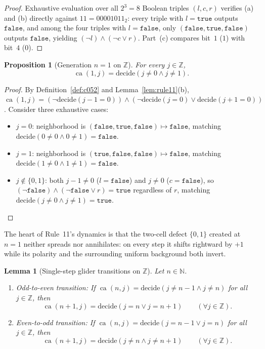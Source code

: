 \documentclass[11pt]{article}
\newtheorem{proposition}[theorem]{Proposition}
\newtheorem{lemma}[theorem]{Lemma}
\theoremstyle{definition}
\newcommand{\N}{\mathbb{N}}
\newcommand{\Z}{\mathbb{Z}}
\newcommand{\ca}{\operatorname{ca}}
\begin{document}
\begin{proof}
Exhaustive evaluation over all $2^3 = 8$ Boolean triples $(l, c, r)$ verifies (a) and (b) directly against $11 = 00001011_2$: every triple with $l = \mathtt{true}$ outputs $\mathtt{false}$, and among the four triples with $l = \mathtt{false}$, only $(\mathtt{false}, \mathtt{true}, \mathtt{false})$ outputs $\mathtt{false}$, yielding $(\neg l) \land (\neg c \lor r)$. Part~(c) compares bit~$1$ ($1$) with bit~$4$ ($0$).
\end{proof}

\begin{proposition}[Generation $n = 1$ on $\Z$]
\label{prop:ca-one}
For every $j \in \Z$,
\[
\ca(1, j) = \mathrm{decide}(j \ne 0 \land j \ne 1).
\]
\end{proposition}

\begin{proof}
By Definition~\ref{def:c052} and Lemma~\ref{lem:rule11}(b), $\ca(1, j) = (\neg \mathrm{decide}(j - 1 = 0)) \land (\neg \mathrm{decide}(j = 0) \lor \mathrm{decide}(j + 1 = 0))$. Consider three exhaustive cases:
\begin{itemize}
\item $j = 0$: neighborhood is $(\mathtt{false}, \mathtt{true}, \mathtt{false}) \mapsto \mathtt{false}$, matching $\mathrm{decide}(0 \ne 0 \land 0 \ne 1) = \mathtt{false}$.
\item $j = 1$: neighborhood is $(\mathtt{true}, \mathtt{false}, \mathtt{false}) \mapsto \mathtt{false}$, matching $\mathrm{decide}(1 \ne 0 \land 1 \ne 1) = \mathtt{false}$.
\item $j \notin \{0, 1\}$: both $j - 1 \ne 0$ ($l = \mathtt{false}$) and $j \ne 0$ ($c = \mathtt{false}$), so $(\neg \mathtt{false}) \land (\neg \mathtt{false} \lor r) = \mathtt{true}$ regardless of $r$, matching $\mathrm{decide}(j \ne 0 \land j \ne 1) = \mathtt{true}$. \qedhere
\end{itemize}
\end{proof}

The heart of Rule~11's dynamics is that the two-cell defect $\{0, 1\}$ created at $n = 1$ neither spreads nor annihilates: on every step it shifts rightward by $+1$ while its polarity and the surrounding uniform background both invert.

\begin{lemma}[Single-step glider transitions on $\Z$]
\label{lem:glider-steps}
Let $n \in \N$.
\begin{enumerate}
\item[\textup{(a)}] \emph{Odd-to-even transition:} If $\ca(n, j) = \mathrm{decide}(j \ne n - 1 \land j \ne n)$ for all $j \in \Z$, then
\[
\ca(n + 1, j) = \mathrm{decide}(j = n \lor j = n + 1) \qquad (\forall j \in \Z).
\]
\item[\textup{(b)}] \emph{Even-to-odd transition:} If $\ca(n, j) = \mathrm{decide}(j = n - 1 \lor j = n)$ for all $j \in \Z$, then
\[
\ca(n + 1, j) = \mathrm{decide}(j \ne n \land j \ne n + 1) \qquad (\forall j \in \Z).
\]
\end{enumerate}
\end{lemma}
\end{document}
